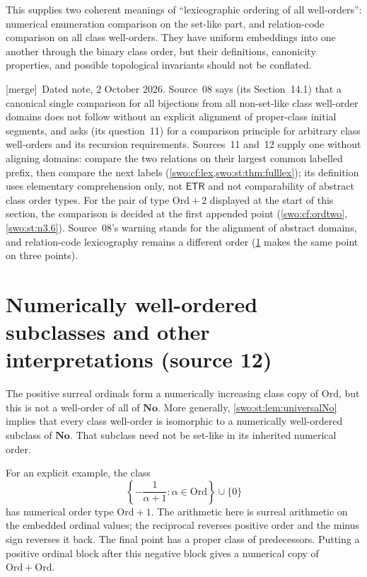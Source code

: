 \documentclass[11pt]{article}
\theoremstyle{definition}
\theoremstyle{remark}
\newcommand{\No}{\mathbf{No}}
\newcommand{\Ord}{\mathrm{Ord}}
\newcommand{\ETR}{\mathsf{ETR}}
\newcommand{\merge}{\textsf{[merge]}}
\begin{document}
This supplies two coherent meanings of ``lexicographic ordering of all
well-orders'': numerical enumeration comparison on the set-like part,
and relation-code comparison on all class well-orders. They have
uniform embeddings into one another through the binary class order,
but their definitions, canonicity properties, and possible topological
invariants should not be conflated.


\merge\ Dated note, 2 October 2026. Source~08 says (its Section~14.1) that a
canonical single comparison for all bijections from all non-set-like class
well-order domains does not follow without an explicit alignment of
proper-class initial segments, and asks (its question~11) for a comparison
principle for arbitrary class well-orders and its recursion requirements.
Sources~11 and~12 supply one without aligning domains: compare the two
relations on their largest common labelled prefix, then compare the next
labels (\cref{swo:cf:lex,swo:st:thm:fulllex}); its definition uses
elementary comprehension only, not $\ETR$ and not comparability of abstract
class order types. For the pair of type $\Ord+2$ displayed at the start of
this section, the comparison is decided at the first appended point
(\cref{swo:cf:ordtwo}, \cref{swo:st:n3.6}). Source~08's warning stands for the
alignment of abstract domains, and relation-code lexicography remains a
different order (\cref{swo:st:sec:subclasses} makes the same point on three
points).

\section{Numerically well-ordered subclasses and other interpretations (source 12)}
\label{swo:st:sec:subclasses}

The positive surreal ordinals form a numerically increasing class copy
of $\Ord$, but this is not a well-order of all of $\No$. More generally,
\cref{swo:st:lem:universalNo} implies that every class well-order is isomorphic
to a numerically well-ordered subclass of $\No$. That subclass need not
be set-like in its inherited numerical order.

For an explicit example, the class
\[
 \left\{-\frac{1}{\alpha+1}:\alpha\in\Ord\right\}\cup\{0\}
\]
has numerical order type $\Ord+1$. The arithmetic here is surreal
arithmetic on the embedded ordinal values; the reciprocal reverses
positive order and the minus sign reverses it back. The final point has
a proper class of predecessors. Putting a positive ordinal block after
this negative block gives a numerical copy of $\Ord+\Ord$.
\end{document}
